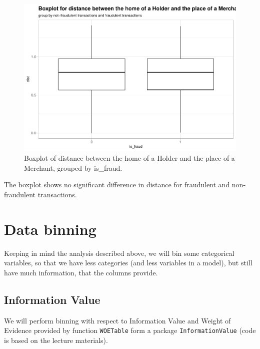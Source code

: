 \documentclass[
]{report}
\begin{document}
\begin{figure}
\centering
\includegraphics{credit_card_fraud_detection_files/figure-latex/dist_plot-1.pdf}
\caption{\label{Fig:dist_plot}Boxplot of distance between the home of a
Holder and the place of a Merchant, grouped by is\_fraud.}
\end{figure}

The boxplot shows no significant difference in distance for fraudulent
and non-fraudulent transactions.

\hypertarget{data-binning}{%
\section{Data binning}\label{data-binning}}

Keeping in mind the analysis described above, we will bin some
categorical variables, so that we have less categories (and less
variables in a model), but still have much information, that the columns
provide.

\hypertarget{information-value}{%
\subsection{Information Value}\label{information-value}}

We will perform binning with respect to Information Value and Weight of
Evidence provided by function \texttt{WOETable} form a package
\texttt{InformationValue} (code is based on the lecture materials).
\end{document}
